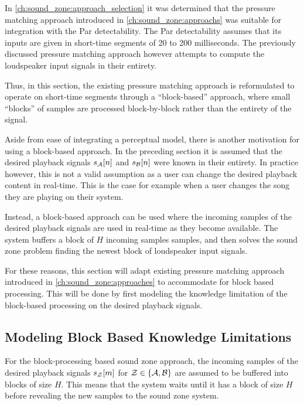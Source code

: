 In \autoref{ch:sound_zone:approach_selection} it was determined that the pressure matching approach introduced in 
\autoref{ch:sound_zone:approachs} was suitable for integration with the Par detectability.
The Par detectability assumes that its inputs are given in short-time segments of 20 to 200 milliseconds.
The previously discussed pressure matching approach however attempts to compute the loudspeaker input signals in their entirety.

Thus, in this section, the existing pressure matching approach is reformulated to operate on short-time segments through a ``block-based'' approach, 
where small ``blocks'' of samples are processed block-by-block rather than the entirety of the signal.

Aside from ease of integrating a perceptual model, there is another motivation for using a block-based approach.
In the preceding section it is assumed that the desired playback signals $s_{\mathcal{A}}[n]$ and $s_{\mathcal{B}}[n]$ were known in their entirety.
In practice however, this is not a valid assumption as a user can change the desired playback content in real-time.
This is the case for example when a user changes the song they are playing on their system.

Instead, a block-based approach can be used where the incoming samples of the desired playback signals are used in real-time as they become available.
The system buffers a block of $H$ incoming samples samples, and then solves the sound zone problem finding the newest block of loudspeaker input signals.

For these reasons, this section will adapt existing pressure matching approach introduced in 
\autoref{ch:sound_zone:approaches} to accommodate for block based processing.
This will be done by first modeling the knowledge limitation of the block-based processing on the desired playback signals.

\subsection{Modeling Block Based Knowledge Limitations}
For the block-processing based sound zone approach, the incoming samples of the desired playback signals 
$s_{\mathcal{Z}}[m]$ for $\mathcal{Z}\in\left\{\mathcal{A},\mathcal{B}\right\}$ are assumed to be buffered into blocks of size $H$.
This means that the system waits until it has a block of size $H$ before revealing the new samples to the sound zone system.

